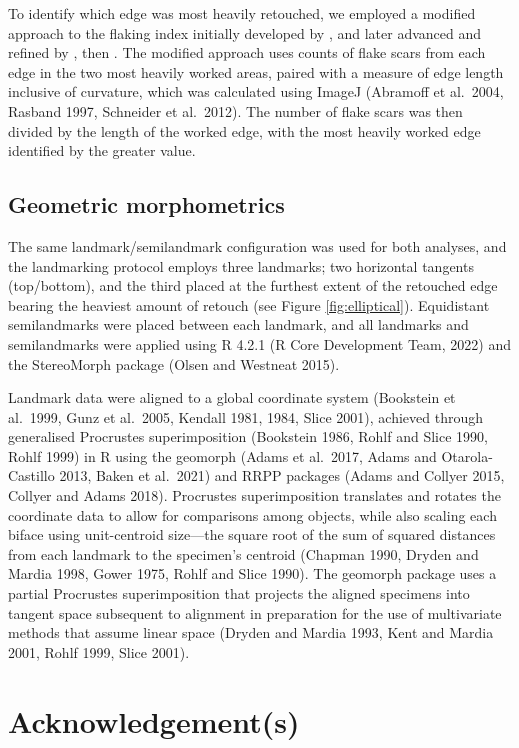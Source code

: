 \documentclass[]{interact}
\theoremstyle{plain}%
\theoremstyle{definition}
\theoremstyle{remark}
\begin{document}
To identify which edge was most heavily retouched, we employed a
modified approach to the flaking index initially developed by
\citet{RN11099}, and later advanced and refined by \citet{RN9242}, then
\citet{RN11098}. The modified approach uses counts of flake scars from
each edge in the two most heavily worked areas, paired with a measure of
edge length inclusive of curvature, which was calculated using ImageJ
(Abramoff et al.~2004, Rasband 1997, Schneider et al.~2012). The number
of flake scars was then divided by the length of the worked edge, with
the most heavily worked edge identified by the greater value.

\hypertarget{geometric-morphometrics}{%
\subsection{Geometric morphometrics}\label{geometric-morphometrics}}

The same landmark/semilandmark configuration was used for both analyses,
and the landmarking protocol employs three landmarks; two horizontal
tangents (top/bottom), and the third placed at the furthest extent of
the retouched edge bearing the heaviest amount of retouch (see Figure
\ref{fig:elliptical}). Equidistant semilandmarks were placed between
each landmark, and all landmarks and semilandmarks were applied using R
4.2.1 (R Core Development Team, 2022) and the StereoMorph package (Olsen
and Westneat 2015).

Landmark data were aligned to a global coordinate system (Bookstein et
al.~1999, Gunz et al.~2005, Kendall 1981, 1984, Slice 2001), achieved
through generalised Procrustes superimposition (Bookstein 1986, Rohlf
and Slice 1990, Rohlf 1999) in R using the geomorph (Adams et al.~2017,
Adams and Otarola-Castillo 2013, Baken et al.~2021) and RRPP packages
(Adams and Collyer 2015, Collyer and Adams 2018). Procrustes
superimposition translates and rotates the coordinate data to allow for
comparisons among objects, while also scaling each biface using
unit-centroid size---the square root of the sum of squared distances
from each landmark to the specimen's centroid (Chapman 1990, Dryden and
Mardia 1998, Gower 1975, Rohlf and Slice 1990). The geomorph package
uses a partial Procrustes superimposition that projects the aligned
specimens into tangent space subsequent to alignment in preparation for
the use of multivariate methods that assume linear space (Dryden and
Mardia 1993, Kent and Mardia 2001, Rohlf 1999, Slice 2001).

\hypertarget{acknowledgements}{%
\section*{Acknowledgement(s)}\label{acknowledgements}}
\end{document}
